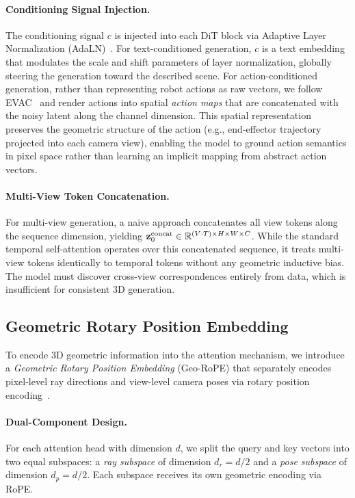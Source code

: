 \paragraph{Conditioning Signal Injection.}
The conditioning signal $c$ is injected into each DiT block via Adaptive Layer Normalization (AdaLN)~\cite{peebles2023dit}. For text-conditioned generation, $c$ is a text embedding that modulates the scale and shift parameters of layer normalization, globally steering the generation toward the described scene. For action-conditioned generation, rather than representing robot actions as raw vectors, we follow EVAC~\cite{huang2025evac} and render actions into spatial \emph{action maps} that are concatenated with the noisy latent along the channel dimension. This spatial representation preserves the geometric structure of the action (e.g., end-effector trajectory projected into each camera view), enabling the model to ground action semantics in pixel space rather than learning an implicit mapping from abstract action vectors.

\paragraph{Multi-View Token Concatenation.}
For multi-view generation, a naive approach concatenates all view tokens along the sequence dimension, yielding $\mathbf{z}_0^{\text{concat}} \in \mathbb{R}^{(V \cdot T) \times H \times W \times C}$. While the standard temporal self-attention operates over this concatenated sequence, it treats multi-view tokens identically to temporal tokens without any geometric inductive bias. The model must discover cross-view correspondences entirely from data, which is insufficient for consistent 3D generation.

\subsection{Geometric Rotary Position Embedding}
\label{sec:camera-pe}

To encode 3D geometric information into the attention mechanism, we introduce a \emph{Geometric Rotary Position Embedding} (Geo-RoPE) that separately encodes pixel-level ray directions and view-level camera poses via rotary position encoding~\cite{su2024rope}.

\paragraph{Dual-Component Design.}
For each attention head with dimension $d$, we split the query and key vectors into two equal subspaces: a \emph{ray subspace} of dimension $d_r = d/2$ and a \emph{pose subspace} of dimension $d_p = d/2$. Each subspace receives its own geometric encoding via RoPE.

